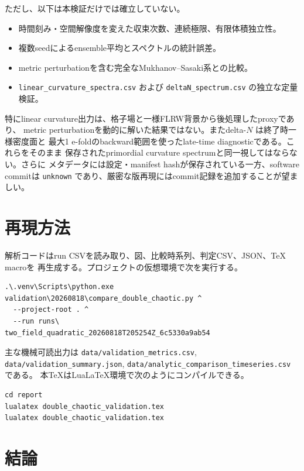\documentclass[a4paper,11pt]{ltjsarticle}
\newcommand{\code}[1]{\texttt{#1}}
\begin{document}
ただし、以下は本検証だけでは確立していない。

\begin{itemize}
  \item 時間刻み・空間解像度を変えた収束次数、連続極限、有限体積独立性。
  \item 複数seedによるensemble平均とスペクトルの統計誤差。
  \item metric perturbationを含む完全なMukhanov--Sasaki系との比較。
  \item \code{linear\_curvature\_spectra.csv} および
        \code{deltaN\_spectrum.csv} の独立な定量検証。
\end{itemize}

特にlinear curvature出力は、格子場と一様FLRW背景から後処理したproxyであり、
metric perturbationを動的に解いた結果ではない。またdelta-$N$ は終了時一様密度面と
最大1 e-foldのbackward範囲を使ったlate-time diagnosticである。これらをそのまま
保存されたprimordial curvature spectrumと同一視してはならない。さらに
メタデータには設定・manifest hashが保存されている一方、software commitは
\code{unknown} であり、厳密な版再現にはcommit記録を追加することが望ましい。

\section{再現方法}

解析コードはrun CSVを読み取り、図、比較時系列、判定CSV、JSON、TeX macroを
再生成する。プロジェクトの仮想環境で次を実行する。

\begin{verbatim}
.\.venv\Scripts\python.exe validation\20260818\compare_double_chaotic.py ^
  --project-root . ^
  --run runs\
two_field_quadratic_20260818T205254Z_6c5330a9ab54
\end{verbatim}

主な機械可読出力は
\code{data/validation\_metrics.csv},
\code{data/validation\_summary.json},
\code{data/analytic\_comparison\_timeseries.csv} である。
本TeXはLuaLaTeX環境で次のようにコンパイルできる。

\begin{verbatim}
cd report
lualatex double_chaotic_validation.tex
lualatex double_chaotic_validation.tex
\end{verbatim}

\section{結論}
\end{document}
